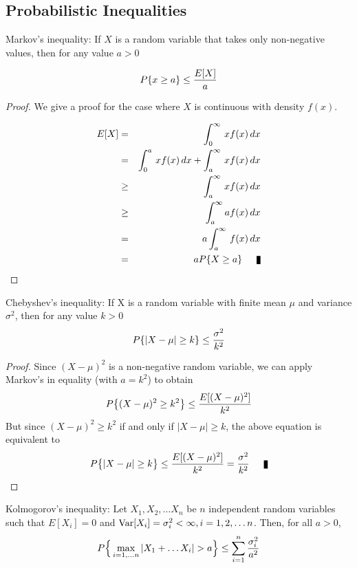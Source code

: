 \subsection{Probabilistic Inequalities}
\label{sec:inequalities}
\begin{proposition}{Markov's inequality:}
If $X$ is a random variable that takes only non-negative values, then for any value $a>0$ 

$$P\{x\ge a\} \le {E[X]\over a}$$
\end{proposition}
\begin{proof}
We give a proof for the case where $X$ is continuous with density $f(x)$.

\begin{eqnarray*}
E[X] &=& \int_0^\infty\, x f(x)\, dx \\
&=& \int_0^a\, x f(x)\, dx + \int_a^\infty\, x f(x)\, dx\\
&\ge& \int_a^\infty\, x f(x)\, dx \\
&\ge& \int_a^\infty a f(x) \, dx \\
&=& a\int_a^\infty\, f(x)\,dx\\
&=& a P\{ X \ge a\}\qed
\end{eqnarray*}

\end{proof}


\begin{proposition}{Chebyshev's inequality:}
If X is a random variable with finite mean $\mu$ and variance $\sigma^2$, then for any value $k>0$
$$P\{\left|X-\mu\right| \ge k \}  \le {\sigma^2\over k^2}$$
\end{proposition}

\begin{proof}
Since $(X-\mu)^2$ is a non-negative random variable, we can apply Markov's in equality (with $a=k^2$) to obtain 
$$P\big\{ (X-\mu)^2 \ge k^2 \big\} \le {E[(X-\mu)^2]\over k^2}$$ But since $(X-\mu)^2 \ge k^2$ if and only if $|X-\mu|\ge k$, the above equation is equivalent to 
$$P\big\{|X-\mu| \ge k \big\} \le {E[(X-\mu)^2]\over k^2} = {\sigma^2\over k^2} \qed$$
\end{proof}

\begin{proposition}{Kolmogorov's inequality:}
Let $X_1, X_2, \hdots X_n$ be $n$ independent random variables such that $E[X_i] = 0$ and $\hbox{Var}[X_i] = \sigma_i^2 < \infty, i = 1, 2,\hdots n$. Then, for all $a>0$,
$$P \Big\{ \max_{i=1,\hdots n} \left| X_1 + \hdots X_i \right| > a \Big\}  \le \sum_{i=1}^n {\sigma_i^2\over a^2}$$
\end{proposition}

